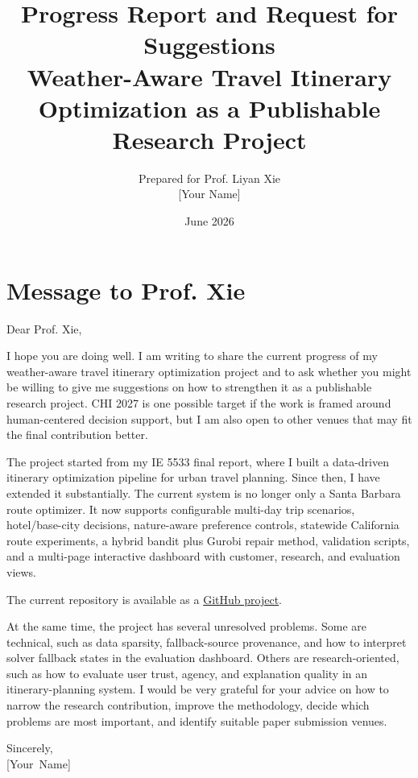 \documentclass[11pt,a4paper]{article}
\title{\vspace{-1.2em}Progress Report and Request for Suggestions\\
\large Weather-Aware Travel Itinerary Optimization as a Publishable Research Project}
\author{Prepared for Prof. Liyan Xie\\[0.5em] [Your Name]}
\date{June 2026}
\begin{document}
\maketitle

\section*{Message to Prof. Xie}

\noindent Dear Prof. Xie,

\vspace{0.5em}

\noindent I hope you are doing well. I am writing to share the current progress of my weather-aware travel itinerary optimization project and to ask whether you might be willing to give me suggestions on how to strengthen it as a publishable research project. CHI 2027 is one possible target if the work is framed around human-centered decision support, but I am also open to other venues that may fit the final contribution better.

The project started from my IE 5533 final report, where I built a data-driven itinerary optimization pipeline for urban travel planning. Since then, I have extended it substantially. The current system is no longer only a Santa Barbara route optimizer. It now supports configurable multi-day trip scenarios, hotel/base-city decisions, nature-aware preference controls, statewide California route experiments, a hybrid bandit plus Gurobi repair method, validation scripts, and a multi-page interactive dashboard with customer, research, and evaluation views.

The current repository is available as a \href{https://github.com/Ztang-Yit-Xiaang/weather-aware-travel-itinerary-optimization}{GitHub project}.

At the same time, the project has several unresolved problems. Some are technical, such as data sparsity, fallback-source provenance, and how to interpret solver fallback states in the evaluation dashboard. Others are research-oriented, such as how to evaluate user trust, agency, and explanation quality in an itinerary-planning system. I would be very grateful for your advice on how to narrow the research contribution, improve the methodology, decide which problems are most important, and identify suitable paper submission venues.

\vspace{0.5em}

\noindent Sincerely,\\
\mbox{[Your Name]}
\end{document}
